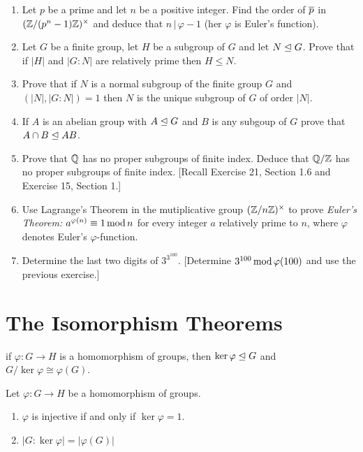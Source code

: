 \documentclass[10pt,a4paper]{report}
\begin{document}
\begin{enumerate}
	\item Let $p$ be a prime and let $n$ be a positive integer.  Find the order of $\overline{p}$ in $(\mathbb{Z}/(p^n-1)\mathbb{Z})^\times$ and deduce that $n\,|\, \varphi-1$ (her $\varphi$ is Euler's function).
	
	\item Let $G$ be a finite group, let $H$ be a subgroup of $G$ and let $N \trianglelefteq G$.  Prove that if $|H|$ and $|G:N|$ are relatively prime then $H\le N$.
	
	\item Prove that if $N$ is a normal subgroup of the finite group $G$ and $(|N|,|G:N|)=1$ then $N$ is the unique subgroup of $G$ of order $|N|$.
	
	\item If $A$ is an abelian group with $A\trianglelefteq G$ and $B$ is any subgoup of $G$ prove that $A\cap B \trianglelefteq AB$.
	
	\item Prove that $\mathbb{Q}$ has no proper subgroups of finite index.  Deduce that $\mathbb{Q}/\mathbb{Z}$ has no proper subgroups of finite index.  [Recall Exercise 21, Section 1.6 and Exercise 15, Section 1.]
	
	\item Use Lagrange's Theorem in the mutiplicative group $(\mathbb{Z}/n\mathbb{Z})^\times$ to prove \textit{Euler's Theorem:} $a^{\varphi(n)}\equiv 1\operatorname{mod}{n}$ for every integer $a$ relatively prime to $n$, where $\varphi$ denotes Euler's $\varphi$-function.
	
	\item Determine the last two digits of $3^{3^{100}}$. [Determine $3^{100} \operatorname{mod}{\varphi(100)}$ and use the previous exercise.]
\end{enumerate}

\section{The Isomorphism Theorems}

\begin{theorem}
if $\varphi:G\to H$ is a homomorphism of groups, then $\ker \varphi \trianglelefteq G$ and $G/\ker \varphi \cong \varphi(G)$.
\end{theorem}

\begin{corollary}  Let $\varphi: G \to H$ be a homomorphism of groups.
\begin{enumerate}
\item $\varphi$ is injective if and only if $\ker \varphi = 1$.
\item $|G:\ker \varphi | = |\varphi(G)|$
\end{enumerate}
\end{corollary}
\end{document}
